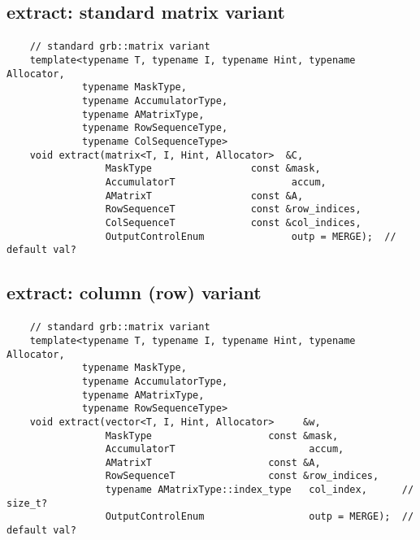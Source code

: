 \subsection{{\sf extract}: standard matrix variant}

\paragraph{\syntax}

\begin{verbatim}
    // standard grb::matrix variant
    template<typename T, typename I, typename Hint, typename Allocator,
             typename MaskType,
             typename AccumulatorType,
             typename AMatrixType,
             typename RowSequenceType,
             typename ColSequenceType>
    void extract(matrix<T, I, Hint, Allocator>  &C,
                 MaskType                 const &mask,
                 AccumulatorT                    accum,
                 AMatrixT                 const &A,
                 RowSequenceT             const &row_indices,
                 ColSequenceT             const &col_indices,
                 OutputControlEnum               outp = MERGE);  // default val?
\end{verbatim}

\subsection{{\sf extract}: column (row) variant}

\paragraph{\syntax}

\begin{verbatim}
    // standard grb::matrix variant
    template<typename T, typename I, typename Hint, typename Allocator,
             typename MaskType,
             typename AccumulatorType,
             typename AMatrixType,
             typename RowSequenceType>
    void extract(vector<T, I, Hint, Allocator>     &w,
                 MaskType                    const &mask,
                 AccumulatorT                       accum,
                 AMatrixT                    const &A,
                 RowSequenceT                const &row_indices,
                 typename AMatrixType::index_type   col_index,      // size_t?
                 OutputControlEnum                  outp = MERGE);  // default val?
\end{verbatim}


